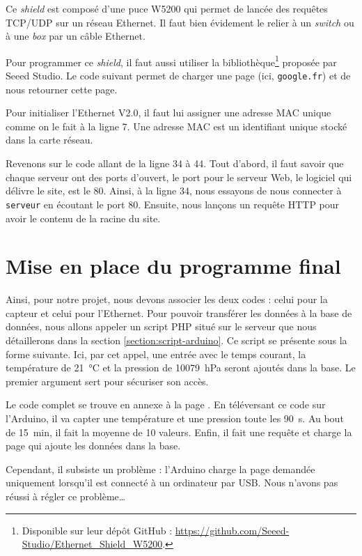 Ce \emph{shield} est composé d'une puce W5200 qui permet de lancée des requêtes TCP/UDP sur un réseau Ethernet. Il faut bien évidement le relier à un \emph{switch} ou à une \emph{box} par un câble Ethernet.

Pour programmer ce \emph{shield}, il faut aussi utiliser la bibliothèque\footnote{Disponible sur leur dépôt GitHub : \url{https://github.com/Seeed-Studio/Ethernet_Shield_W5200}.} proposée par Seeed Studio. Le code suivant permet de charger une page (ici, \verb-google.fr-) et de nous retourner cette page.


Pour initialiser l'Ethernet V2.0, il faut lui assigner une adresse MAC unique comme on le fait à la ligne 7. Une adresse MAC est un identifiant unique stocké dans la carte réseau.

Revenons sur le code allant de la ligne 34 à 44. Tout d'abord, il faut savoir que chaque serveur ont des ports d'ouvert, le port pour le serveur Web, le logiciel qui délivre le site, est le 80. Ainsi, à la ligne 34, nous essayons de nous connecter à \verb-serveur- en écoutant le port 80. Ensuite, nous lançons un requête HTTP pour avoir le contenu de la racine du site.

\section{Mise en place du programme final}
\label{section:url-arduino}

Ainsi, pour notre projet, nous devons associer les deux codes : celui pour la capteur et celui pour l'Ethernet. Pour pouvoir transférer les données à la base de données, nous allons appeler un script PHP situé sur le serveur que nous détaillerons dans la section \ref{section:script-arduino}. Ce script se présente sous la forme suivante.
Ici, par cet appel, une entrée avec le temps courant, la température de \SI{21}{\celsius} et la pression de \SI{10079}{\hecto\pascal} seront ajoutés dans la base. Le premier argument sert pour sécuriser son accès.

\Espace

Le code complet se trouve en annexe à la page \pageref{code:arduino}. En téléversant ce code sur l'Arduino, il va capter une température et une pression toute les \SI{90}{\second}. Au bout de \SI{15}{\minute}, il fait la moyenne de 10 valeurs. Enfin, il fait une requête et charge la page qui ajoute les données dans la base.

Cependant, il subsiste un problème : l'Arduino charge la page demandée uniquement lorsqu'il est connecté à un ordinateur par USB. Nous n'avons pas réussi à régler ce problème\dots
